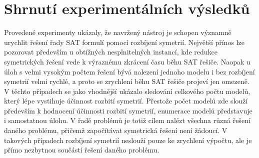 

\section{Shrnutí experimentálních výsledků}
\label{sec36}
Provedené experimenty ukázaly, že navržený nástroj je schopen významně urychlit řešení řady SAT formulí pomocí rozbíjení symetrií. Největší přínos lze pozorovat především u obtížných nesplnitelných instancí, kde redukce symetrických řešení vede k výraznému zkrácení času běhu SAT řešiče. Naopak u úloh s velmi vysokým počtem řešení bývá nalezení jednoho modelu i bez rozbíjení symetrií velmi rychlé, a proto se zrychlení běhu SAT řešiče projeví jen omezeně. V těchto případech se jako vhodnější ukázalo sledování celkového počtu modelů, který lépe vystihuje účinnost rozbití symetrií. Přestože počet modelů zde slouží především k hodnocení účinnosti rozbití symetrií, enumerace modelů představuje i samostatnou úlohu. V řadě problémů je totiž cílem nalézt všechna různá řešení daného problému, přičemž započítávat symetrická řešení není žádoucí. V takových případech rozbíjení symetrií neslouží pouze ke zrychlení výpočtu, ale je přímo nezbytnou součástí řešení daného problému.

